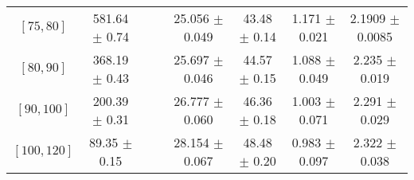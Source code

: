 \begin{tabular}{c||c|c|c|c|c|c|c}
$[75, 80]$ & 581.64 $\pm$ 0.74 &  &  & 25.056 $\pm$ 0.049 & 43.48 $\pm$ 0.14 & 1.171 $\pm$ 0.021 & 2.1909 $\pm$ 0.0085\\
$[80, 90]$ & 368.19 $\pm$ 0.43 &  &  & 25.697 $\pm$ 0.046 & 44.57 $\pm$ 0.15 & 1.088 $\pm$ 0.049 & 2.235 $\pm$ 0.019\\
$[90, 100]$ & 200.39 $\pm$ 0.31 &  &  & 26.777 $\pm$ 0.060 & 46.36 $\pm$ 0.18 & 1.003 $\pm$ 0.071 & 2.291 $\pm$ 0.029\\
$[100, 120]$ & 89.35 $\pm$ 0.15 &  &  & 28.154 $\pm$ 0.067 & 48.48 $\pm$ 0.20 & 0.983 $\pm$ 0.097 & 2.322 $\pm$ 0.038\\
\end{tabular}
